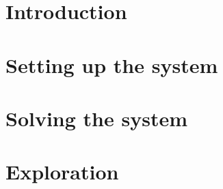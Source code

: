 \documentclass[12pt]{book} %
\begin{document}


\newpage %

\tableofcontents


\mainmatter
\chapter{Introduction}



\chapter{Setting up the system} 



\chapter{Solving the system}



\chapter{Exploration}


%
\end{document}
